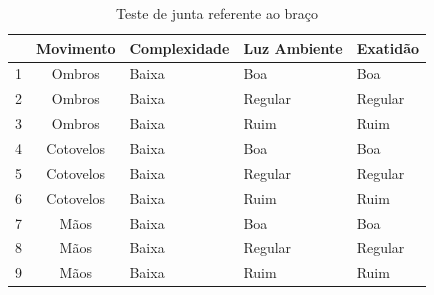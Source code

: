   \begin{table}[H]
  \centering
  \caption{Teste de junta referente ao braço}
  \label{tab:braco}
  \begin{tabular}{@{}|c|c|l|l|l|@{}}
  \toprule
  \multicolumn{1}{|l|}{ } & \multicolumn{1}{l|}{\textbf{Movimento}} & \textbf{Complexidade} & \textbf{Luz Ambiente} & \textbf{Exatidão} \\ \midrule
  1                                 & Ombros                     & Baixa                 & Boa                   & Boa               \\ \midrule
  2                                 & Ombros                     & Baixa                 & Regular               & Regular           \\ \midrule
  3                                 & Ombros                     & Baixa                 & Ruim                  & Ruim              \\ \bottomrule
  4                                 & Cotovelos                     & Baixa                 & Boa                   & Boa               \\ \midrule
  5                                 & Cotovelos                     & Baixa                 & Regular               & Regular           \\ \midrule
  6                                 & Cotovelos                     & Baixa                 & Ruim                  & Ruim              \\ \bottomrule
  7                                 & Mãos                         & Baixa                 & Boa                   & Boa               \\ \midrule
  8                                 & Mãos                         & Baixa                 & Regular               & Regular           \\ \midrule
  9                                 & Mãos                         & Baixa                 & Ruim                  & Ruim              \\ \bottomrule
  \end{tabular}
  \end{table}

